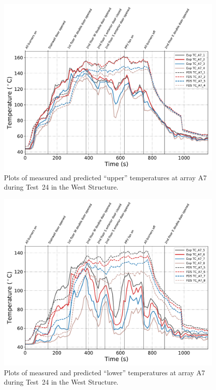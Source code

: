 \begin{figure}[!h]
	\centering
	\includegraphics[width=\columnwidth]{Figures/Plots/Validation/Temperature/Test_24_TC_A7_upper}
	\caption{Plots of measured and predicted ``upper'' temperatures at array A7 during Test~24 in the West Structure.}
	\label{fig:TCA7_upper_data_Test24}
\end{figure}

\begin{figure}[!h]
	\centering
	\includegraphics[width=\columnwidth]{Figures/Plots/Validation/Temperature/Test_24_TC_A7_lower}
	\caption{Plots of measured and predicted ``lower'' temperatures at array A7 during Test~24 in the West Structure.}
	\label{fig:TCA7_lower_data_Test24}
\end{figure}

